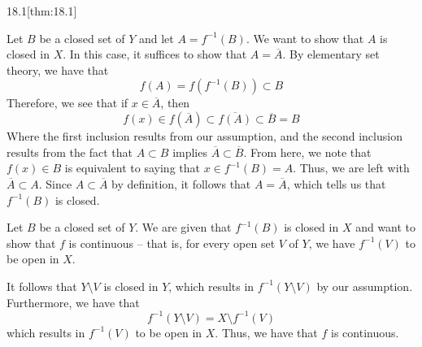 \begin{thmBox}{18.1}[thm:18.1]
\begin{proofBox}
        \baseSkip 


        Let \( B \) be a closed set of \( Y \) and let \( A = f^{ -1 } ( B ) \).
        We want to show that \( A \) is closed in \( X \).
        In this case, it suffices to show that \( A = \overline{ A } \).
        By elementary set theory, we have that 
        \begin{equation*}
            f ( A )
            =
            f ( f^{ -1 } ( B ) )
            \subset 
            B
        \end{equation*}
        Therefore, we see that if \( x \in \overline{ A } \), then 
        \begin{equation*}
            f ( x ) \in f ( \overline{ A } ) 
            \subset 
            \overline{ f ( A ) }
            \subset 
            \overline{ B } = B
        \end{equation*}
        Where the first inclusion results from our assumption, and the second 
        inclusion results from the fact that \( A \subset B \) implies 
        \( \overline{ A } \subset \overline{ B } \).
        From here, we note that \( f ( x ) \in B \) is equivalent to saying that
        \( x \in f^{ -1 } ( B ) = A \). 
        Thus, we are left with \( \overline{ A } \subset A \).
        Since \( A \subset \overline{ A } \) by definition, it follows that 
        \( A = \overline{ A } \), which tells us that \( f^{ -1 } ( B ) \) is
        closed.

        \baseSkip 


        Let \( B \) be a closed set of \( Y \).
        We are given that \( f^{ -1 } ( B ) \) is closed in \( X \) and want to
        show that \( f \) is continuous -- that is, for every open set 
        \( V \) of \( Y \), we have \( f^{ -1 } ( V ) \) to be open in \( X \).

        \baseSkip

        It follows that \( Y \setminus V \) is closed in \( Y \), which results 
        in \( f^{ -1 } ( Y \setminus V ) \) by our assumption.
        Furthermore, we have that 
        \begin{equation*}
            f^{ -1 } ( Y \setminus V ) = X \setminus f^{ -1 } ( V )
        \end{equation*}
        which results in \( f^{ -1 } ( V ) \) to be open in \( X \).
        Thus, we have that \( f \) is continuous.


\end{proofBox}
\end{thmBox}

